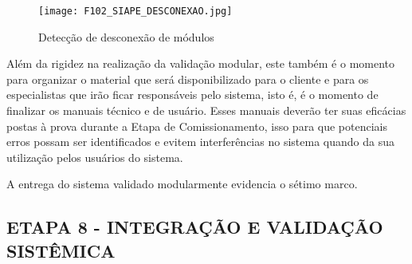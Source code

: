  \begin{figure}[h]
 	\centering
 	\texttt{[image: F102\_SIAPE\_DESCONEXAO.jpg]} 
 	\caption{Detecção de desconexão de módulos}
 	\label{F102}
 \end{figure}


Além da rigidez na realização da validação modular, este também é o momento para organizar o material que será disponibilizado para o cliente e para os especialistas que irão ficar responsáveis pelo sistema, isto é, é o momento de finalizar os manuais técnico e de usuário. Esses manuais deverão ter suas eficácias postas à prova durante a Etapa de Comissionamento, isso para que potenciais erros possam ser identificados e evitem interferências no sistema quando da sua utilização pelos usuários do sistema.

A entrega do sistema validado modularmente evidencia o sétimo marco.



\clearpage

\subsection{ETAPA 8 - INTEGRAÇÃO E VALIDAÇÃO SISTÊMICA}

